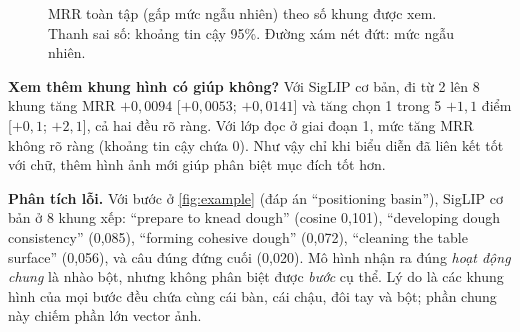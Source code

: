 \documentclass[a4paper,oneside]{report}
\begin{document}
\begin{figure}[ht]
\centering
{}
\caption{MRR toàn tập (gấp mức ngẫu nhiên) theo số khung được xem. Thanh sai số: khoảng tin cậy 95\%. Đường xám nét đứt: mức ngẫu nhiên.}
\label{fig:lift}
\end{figure}

\textbf{Xem thêm khung hình có giúp không?} Với SigLIP cơ bản, đi từ 2 lên 8 khung tăng MRR $+0{,}0094$ [$+0{,}0053$; $+0{,}0141$] và tăng chọn 1 trong 5 $+1{,}1$ điểm [$+0{,}1$; $+2{,}1$], cả hai đều rõ ràng. Với lớp đọc ở giai đoạn 1, mức tăng MRR không rõ ràng (khoảng tin cậy chứa 0). Như vậy chỉ khi biểu diễn đã liên kết tốt với chữ, thêm hình ảnh mới giúp phân biệt mục đích tốt hơn.

\textbf{Phân tích lỗi.} Với bước ở \cref{fig:example} (đáp án ``positioning basin''), SigLIP cơ bản ở 8 khung xếp: ``prepare to knead dough'' (cosine 0,101), ``developing dough consistency'' (0,085), ``forming cohesive dough'' (0,072), ``cleaning the table surface'' (0,056), và câu đúng đứng cuối (0,020). Mô hình nhận ra đúng \textit{hoạt động chung} là nhào bột, nhưng không phân biệt được \textit{bước} cụ thể. Lý do là các khung hình của mọi bước đều chứa cùng cái bàn, cái chậu, đôi tay và bột; phần chung này chiếm phần lớn vector ảnh.
\end{document}
